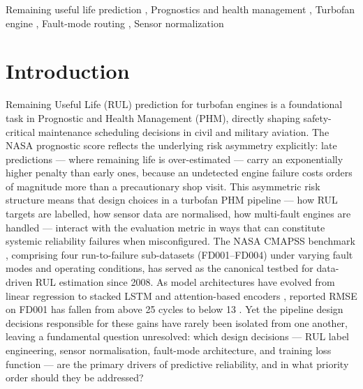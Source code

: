 \documentclass[review,12pt]{elsarticle}
\begin{document}
\begin{frontmatter}
\begin{abstract}
These findings suggest a three-tier design priority --- label engineering, fault-mode architecture, loss function --- where each tier produced qualitatively larger effects than the tier below it in the present experiments; gate misclassification analysis identifies gate confidence as an indicator of routing decisiveness, summarising priorities across the four CMAPSS sub-datasets as a structured starting point requiring validation on representative fleet data before operational deployment.
\end{abstract}

\begin{keyword}
Remaining useful life prediction \sep
Prognostics and health management \sep
Turbofan engine \sep
Fault-mode routing \sep
Sensor normalization
\end{keyword}

\end{frontmatter}

\linenumbers


\section{Introduction}

Remaining Useful Life (RUL) prediction for turbofan engines is a foundational task in Prognostic and Health Management (PHM), directly shaping safety-critical maintenance scheduling decisions in civil and military aviation. The NASA prognostic score reflects the underlying risk asymmetry explicitly: late predictions — where remaining life is over-estimated — carry an exponentially higher penalty than early ones, because an undetected engine failure costs orders of magnitude more than a precautionary shop visit. This asymmetric risk structure means that design choices in a turbofan PHM pipeline — how RUL targets are labelled, how sensor data are normalised, how multi-fault engines are handled — interact with the evaluation metric in ways that can constitute systemic reliability failures when misconfigured. The NASA CMAPSS benchmark \cite{ref01}, comprising four run-to-failure sub-datasets (FD001–FD004) under varying fault modes and operating conditions, has served as the canonical testbed for data-driven RUL estimation since 2008. As model architectures have evolved from linear regression \cite{ref02} to stacked LSTM \cite{ref05,ref06} and attention-based encoders \cite{ref13,ref14,ref45}, reported RMSE on FD001 has fallen from above 25 cycles to below 13 \cite{ref15}. Yet the pipeline design decisions responsible for these gains have rarely been isolated from one another, leaving a fundamental question unresolved: which design decisions --- RUL label engineering, sensor normalisation, fault-mode architecture, and training loss function --- are the primary drivers of predictive reliability, and in what priority order should they be addressed?
\end{document}
